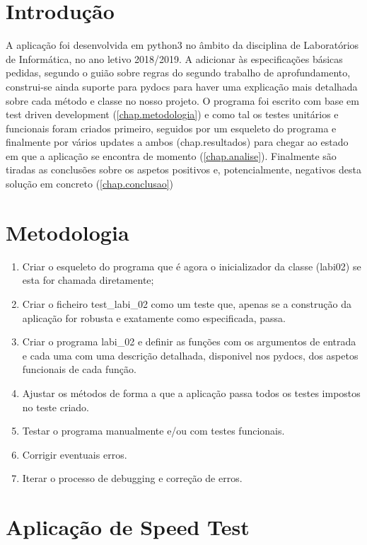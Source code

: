 \documentclass{report}
\begin{document}
\chapter{Introdução}
\label{chap.introducao}

A aplicação foi desenvolvida em python3 no âmbito da disciplina de Laboratórios de Informática, no ano letivo 2018/2019. A adicionar às especificações básicas pedidas, segundo o guião sobre regras do segundo trabalho de aprofundamento, construi-se ainda suporte para pydocs para haver uma explicação mais detalhada sobre cada método e classe no nosso projeto. O programa foi escrito com base em test driven development (\autoref{chap.metodologia}) e como tal os testes unitários e funcionais foram criados primeiro, seguidos por um esqueleto do programa e finalmente por vários updates a ambos ({chap.resultados}) para chegar ao estado em que a aplicação se encontra de momento (\autoref{chap.analise}). Finalmente são tiradas as conclusões sobre os aspetos positivos e, potencialmente, negativos desta solução em concreto (\autoref{chap.conclusao})


\chapter{Metodologia}
\label{chap.metodologia}

\begin{enumerate}
	\item Criar o esqueleto do programa que é agora o inicializador da classe (labi02) se esta for chamada diretamente;
	\item Criar o ficheiro test\_labi\_02 como um teste que, apenas se a construção da aplicação for robusta e exatamente como especificada, passa.
	\item Criar o programa labi\_02 e definir as funções com os argumentos de entrada e cada uma com uma descrição detalhada, disponivel nos pydocs, dos aspetos funcionais de cada função.
	\item Ajustar os métodos de forma a que a aplicação passa todos os testes impostos no teste criado.
	\item Testar o programa manualmente e/ou com testes funcionais.
	\item Corrigir eventuais erros.
	\item Iterar o processo de debugging e correção de erros.
\end{enumerate}


\chapter{Aplicação de Speed Test}
\label{chap.Aplicação de Speed Test}
\end{document}
